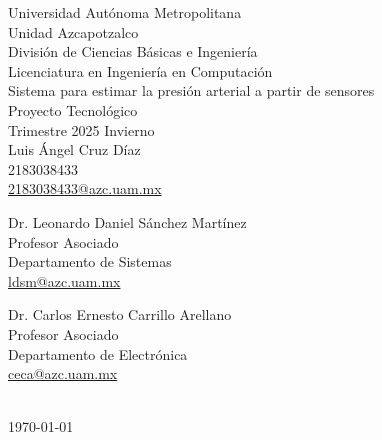 \begin{titlepage}
    \vspace*{\fill}
    \center
    
    \Large Universidad Autónoma Metropolitana\\
    \large {Unidad Azcapotzalco}\\
    \normalsize
    División de Ciencias Básicas e Ingeniería\\
    Licenciatura en Ingeniería en Computación\\[2cm]
    
    {\large Sistema para estimar la presión arterial a partir de sensores}\\

    Proyecto Tecnológico\\[1cm]
    
    Trimestre 2025 Invierno \\[2cm]
    
    Luis Ángel Cruz Díaz\\
    2183038433\\
    \href{mailto:2183038433@azc.uam.mx}{2183038433@azc.uam.mx}\\[2cm]
    
    \begin{minipage}{0.4\textwidth}
        \centering
        Dr. Leonardo Daniel Sánchez Martínez \\
        Profesor Asociado\\
        Departamento de Sistemas\\
        \href{mailto:ldsm@azc.uam.mx}{ldsm@azc.uam.mx}
    \end{minipage}
    \begin{minipage}{0.4\textwidth}
        \centering
        Dr. Carlos Ernesto Carrillo Arellano\\
        Profesor Asociado\\
        Departamento de Electrónica\\
        \href{mailto:ceca@azc.uam.mx}{ceca@azc.uam.mx}%
    \end{minipage}\\[1cm]
    
    \textspanish{\today}
    
    \vfill
    \vspace*{\fill}
\end{titlepage}